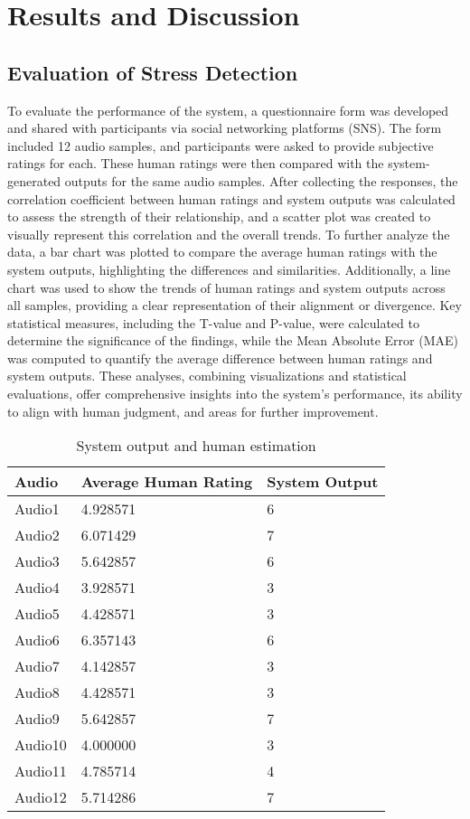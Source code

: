 \documentclass[a4j, twocolumn]{article}
\begin{document}
\section{Results and Discussion}
  \subsection{Evaluation of Stress Detection}
  To evaluate the performance of the system, a questionnaire form was developed and shared with participants via social networking platforms (SNS). The form included 12 audio samples, and participants were asked to provide subjective ratings for each. These human ratings were then compared with the system-generated outputs for the same audio samples. After collecting the responses, the correlation coefficient between human ratings and system outputs was calculated to assess the strength of their relationship, and a scatter plot was created to visually represent this correlation and the overall trends. To further analyze the data, a bar chart was plotted to compare the average human ratings with the system outputs, highlighting the differences and similarities. Additionally, a line chart was used to show the trends of human ratings and system outputs across all samples, providing a clear representation of their alignment or divergence. Key statistical measures, including the T-value and P-value, were calculated to determine the significance of the findings, while the Mean Absolute Error (MAE) was computed to quantify the average difference between human ratings and system outputs. These analyses, combining visualizations and statistical evaluations, offer comprehensive insights into the system’s performance, its ability to align with human judgment, and areas for further improvement. 
\begin{table}[H]
\centering
\caption{System output and human estimation}
\label{tab:correlation_table}
\renewcommand{\arraystretch}{1.3}

\begin{tabular}{|p{1.3cm}|p{3cm}|p{1cm}|}
\hline
\textbf{Audio} & \textbf{Average Human Rating} & \textbf{System Output} \\
\hline
Audio1 & 4.928571 & 6 \\
Audio2 & 6.071429 & 7 \\
Audio3 & 5.642857 & 6 \\
Audio4 & 3.928571 & 3 \\
Audio5 & 4.428571 & 3 \\
Audio6 & 6.357143 & 6 \\
Audio7 & 4.142857 & 3 \\
Audio8 & 4.428571 & 3 \\
Audio9 & 5.642857 & 7 \\
Audio10 & 4.000000 & 3 \\
Audio11 & 4.785714 & 4 \\
Audio12 & 5.714286 & 7 \\
\hline
\end{tabular}
\end{table}
\end{document}
